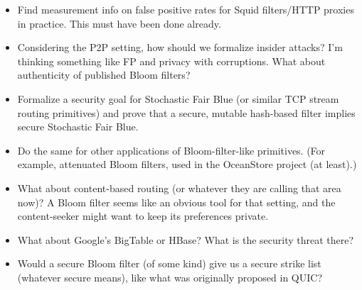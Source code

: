 \begin{itemize}
\item Find measurement info on false positive rates for Squid filters/HTTP proxies in practice.  This must have been done already.

\item Considering the P2P setting, how should we formalize insider attacks?  I'm thinking something like FP and privacy with corruptions.  What about authenticity of published Bloom filters?


\item Formalize a security goal for Stochastic Fair Blue (or similar TCP stream routing primitives) and prove that a secure, mutable hash-based filter implies secure Stochastic Fair Blue.

\item Do the same for other applications of Bloom-filter-like primitives.  (For example, attenuated Bloom filters, used in the OceanStore project (at least).)

\item What about content-based routing (or whatever they are calling that area now)?  A Bloom filter seems like an obvious tool for that setting, and the content-seeker might want to keep its preferences private.

\item What about Google's BigTable or HBase?  What is the security threat there?

\item Would a secure Bloom filter (of some kind) give us a secure strike list (whatever secure means), like what was originally proposed in QUIC?

\end{itemize}